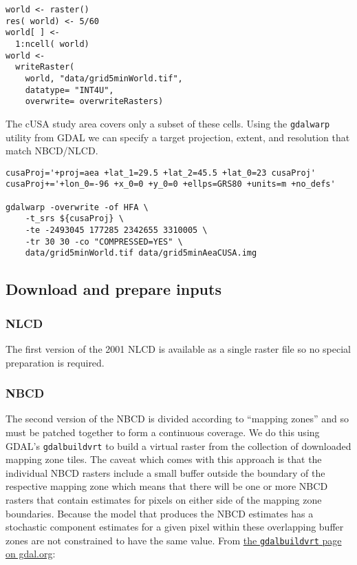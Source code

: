 \documentclass[11pt]{article}
\begin{document}
\begin{verbatim}
world <- raster()
res( world) <- 5/60
world[ ] <-
  1:ncell( world)
world <-
  writeRaster(
    world, "data/grid5minWorld.tif",
    datatype= "INT4U",
    overwrite= overwriteRasters)
\end{verbatim}

The cUSA study area covers only a subset of these cells.  Using the
\texttt{gdalwarp} utility from GDAL we can specify a target projection,
extent, and resolution that match NBCD/NLCD.


\begin{verbatim}
cusaProj='+proj=aea +lat_1=29.5 +lat_2=45.5 +lat_0=23 cusaProj'
cusaProj+='+lon_0=-96 +x_0=0 +y_0=0 +ellps=GRS80 +units=m +no_defs'

gdalwarp -overwrite -of HFA \
    -t_srs ${cusaProj} \
    -te -2493045 177285 2342655 3310005 \
    -tr 30 30 -co "COMPRESSED=YES" \
    data/grid5minWorld.tif data/grid5minAeaCUSA.img
\end{verbatim}
\subsection{Download and prepare inputs}
\label{sec-3-2}
\subsubsection{NLCD}
\label{sec-3-2-1}


The first version of the 2001 NLCD is available as a single raster
file so no special preparation is required.
\subsubsection{NBCD}
\label{sec-3-2-2}


The second version of the NBCD is divided according to ``mapping zones''
and so must be patched together to form a continuous coverage.  We do
this using GDAL's \texttt{gdalbuildvrt} to build a virtual raster from the
collection of downloaded mapping zone tiles.  The caveat which comes
with this approach is that the individual NBCD rasters include a small
buffer outside the boundary of the respective mapping zone which means
that there will be one or more NBCD rasters that contain estimates for
pixels on either side of the mapping zone boundaries.  Because the
model that produces the NBCD estimates has a stochastic component
estimates for a given pixel within these overlapping buffer zones are
not constrained to have the same value.  From \href{http://gdal.org/gdalbuildvrt.html}{the \texttt{gdalbuildvrt} page on gdal.org}:
\end{document}
